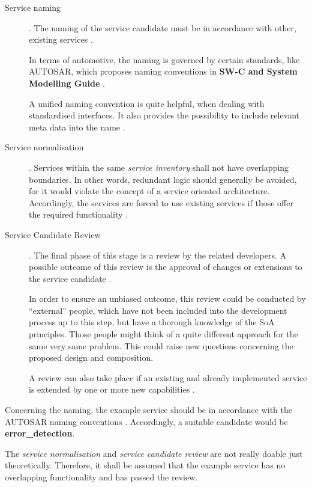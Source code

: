 \begin{description}
	\item [Service naming] .
	The naming of the service candidate must be in accordance with other, existing services \cite[p.206]{erl2011}.

	In terms of automotive, the naming is governed by certain standards, like AUTOSAR, which proposes naming conventions in \textbf{SW-C and System Modelling Guide} \cite{autosar_system_modelling}.

	A unified naming convention is quite helpful, when dealing with standardised interfaces. It also provides the possibility to include relevant meta data into the name \cite{rehner2013}.

	\item [Service normalisation] .
	Services within the same \emph{service inventory} shall not have overlapping boundaries. In other words, redundant logic should generally be avoided, for it would violate the concept of a service oriented architecture. Accordingly, the services are forced to use existing services if those offer the required functionality \cite[p.207]{erl2011}.

	\item [Service Candidate Review] .
	The final phase of this stage is a review by the related developers. A possible outcome of this review is the approval of changes or extensions to the service candidate \cite[p.210]{erl2011}.

	In order to ensure an unbiased outcome, this review could be conducted by ``external'' people, which have not been included into the development process up to this step, but have a thorough knowledge of the SoA principles. Those people might think of a quite different approach for the same very same problem. This could raise new questions concerning the proposed design and composition.

	A review can also take place if an existing and already implemented service is extended by one or more new capabilities \cite[p.210]{erl2011}.
\end{description}


\begin{mdframed}
Concerning the naming, the example service should be in accordance with the AUTOSAR naming conventions \cite{autosar_system_modelling}. Accordingly, a suitable candidate would be \textbf{error\_detection}.

The \emph{service normalisation} and \emph{service candidate review} are not really doable just theoretically. Therefore, it shall be assumed that the example service has no overlapping functionality and has passed the review.
\end{mdframed}





